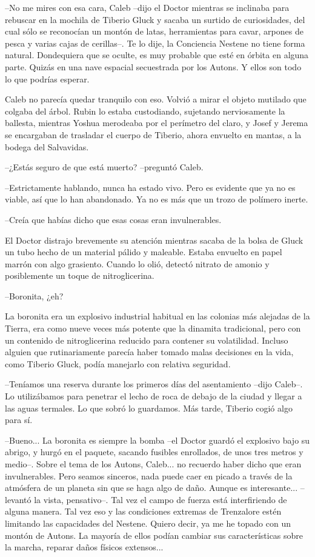 --No me mires con esa cara, Caleb --dijo el Doctor mientras se inclinaba para rebuscar en la mochila de Tiberio Gluck y sacaba un surtido de curiosidades, del cual sólo se reconocían un montón de latas, herramientas para cavar, arpones de pesca y varias cajas de cerillas--. Te lo dije, la Conciencia Nestene no tiene forma natural. Dondequiera que se oculte, es muy probable que esté en órbita en alguna parte. Quizás en una nave espacial secuestrada por los Autons. Y ellos son todo lo que podrías esperar.
 
Caleb no parecía quedar tranquilo con eso. Volvió a mirar el objeto mutilado que colgaba del árbol. Rubin lo estaba custodiando, sujetando nerviosamente la ballesta, mientras Yoshua merodeaba por el perímetro del claro, y Josef y Jerema se encargaban de trasladar el cuerpo de Tiberio, ahora envuelto en mantas, a la bodega del Salvavidas.
 
--¿Estás seguro de que está muerto? --preguntó Caleb.
 
--Estrictamente hablando, nunca ha estado vivo. Pero es evidente que ya no es viable, así que lo han abandonado. Ya no es más que un trozo de polímero inerte.
 
--Creía que habías dicho que esas cosas eran invulnerables.
 
El Doctor distrajo brevemente su atención mientras sacaba de la bolsa de Gluck un tubo hecho de un material pálido y maleable. Estaba envuelto en papel marrón con algo grasiento. Cuando lo olió, detectó nitrato de amonio y posiblemente un toque de nitroglicerina.
 
--Boronita, ¿eh?
 
La boronita era un explosivo industrial habitual en las colonias más alejadas de la Tierra, era como nueve veces más potente que la dinamita tradicional, pero con un contenido de nitroglicerina reducido para contener su volatilidad. Incluso alguien que rutinariamente parecía haber tomado malas decisiones en la vida, como Tiberio Gluck, podía manejarlo con relativa seguridad.
 
--Teníamos una reserva durante los primeros días del asentamiento --dijo Caleb--. Lo utilizábamos para penetrar el lecho de roca de debajo de la ciudad y llegar a las aguas termales. Lo que sobró lo guardamos. Más tarde, Tiberio cogió algo para sí.
 
--Bueno... La boronita es siempre la bomba --el Doctor guardó el explosivo bajo su abrigo, y hurgó en el paquete, sacando fusibles enrollados, de unos tres metros y medio--. Sobre el tema de los Autons, Caleb... no recuerdo haber dicho que eran invulnerables. Pero seamos sinceros, nada puede caer en picado a través de la atmósfera de un planeta sin que se haga algo de daño. Aunque es interesante... --levantó la vista, pensativo--. Tal vez el campo de fuerza está interfiriendo de alguna manera. Tal vez eso y las condiciones extremas de Trenzalore estén limitando las capacidades del Nestene. Quiero decir, ya me he topado con un montón de Autons. La mayoría de ellos podían cambiar sus características sobre la marcha, reparar daños físicos extensos...
 
